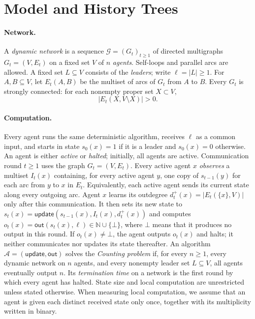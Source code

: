 \documentclass[11pt]{article}
\begin{document}
\section{Model and History Trees}
\label{sec:model}

\paragraph{Network.}
A \emph{dynamic network} is a sequence \(\mathcal G=(G_t)_{t\geq1}\) of directed
multigraphs \(G_t=(V,E_t)\) on a fixed set \(V\) of \(n\) \emph{agents}.  Self-loops
and parallel arcs are allowed.  A fixed set \(L\subseteq V\) consists of the
\emph{leaders}; write \(\ell=|L|\geq1\).  For \(A,B\subseteq V\), let \(E_t(A,B)\)
be the multiset of arcs of \(G_t\) from \(A\) to \(B\).  Every \(G_t\) is
strongly connected: for each nonempty
proper set \(X\subset V\),
\[
                 |E_t(X,V\setminus X)|>0.
\tag{SC}
\]

\paragraph{Computation.}
Every agent runs the same deterministic algorithm, receives \(\ell\) as a
common input, and starts in state \(s_0(x)=1\) if it is a leader and
\(s_0(x)=0\) otherwise.
An agent is either \emph{active} or \emph{halted}; initially, all agents
are active.
Communication round \(t\geq1\) uses the graph \(G_t=(V,E_t)\).
Every active agent \(x\) \emph{observes} a multiset \(I_t(x)\)
containing, for every active agent \(y\), one copy of \(s_{t-1}(y)\)
for each arc from \(y\) to \(x\) in \(E_t\).
Equivalently, each active agent sends its current state along every
outgoing arc.
Agent \(x\) learns its outdegree
\(d_t^+(x)=|E_t(\{x\},V)|\) only after this communication.
It then sets its new state to
\(s_t(x)=\mathsf{update}(s_{t-1}(x),I_t(x),d_t^+(x))\)
and computes
\(o_t(x)=\mathsf{out}(s_t(x),\ell)\in\mathbb N\cup\{\bot\}\),
where \(\bot\) means that it produces no output in this round.
If \(o_t(x)\neq\bot\), the agent outputs \(o_t(x)\) and halts;
it neither communicates nor updates its state thereafter.
An algorithm \(\mathcal A=(\mathsf{update},\mathsf{out})\)
solves the \emph{Counting problem} if, for every \(n\geq1\),
every dynamic network on \(n\) agents, and every nonempty leader set
\(L\subseteq V\), all agents eventually output \(n\).
Its \emph{termination time} on a network is the first round by which
every agent has halted.
State size and local computation are unrestricted unless stated otherwise.
When measuring local computation, we assume that an agent is given each distinct received state only once, together with its multiplicity written in binary.
\end{document}
